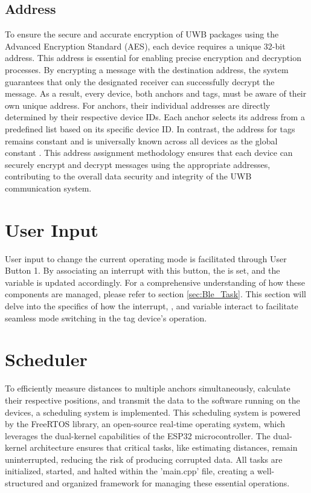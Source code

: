 \subsection{Address}
To ensure the secure and accurate encryption of UWB packages using the Advanced Encryption Standard (AES), each device requires a unique 32-bit address. 
This address is essential for enabling precise encryption and decryption processes. 
By encrypting a message with the destination address, the system guarantees that only the designated receiver can successfully decrypt the message. 
As a result, every device, both anchors and tags, must be aware of their own unique address.
\vspace{4pt}
\newline
For anchors, their individual addresses are directly determined by their respective device IDs. 
Each anchor selects its address from a predefined list based on its specific device ID. 
In contrast, the address for tags remains constant and is universally known across all devices as the global constant . 
This address assignment methodology ensures that each device can securely encrypt and decrypt messages using the appropriate addresses, contributing to the overall data security and integrity of the UWB communication system.

\section{User Input}
User input to change the current operating mode is facilitated through User Button 1. 
By associating an interrupt with this button, the  is set, and the  variable is updated accordingly. 
For a comprehensive understanding of how these components are managed, please refer to section \ref{sec:Ble_Task}. 
This section will delve into the specifics of how the interrupt, , and  variable interact to facilitate seamless mode switching in the tag device's operation. 


\section{Scheduler}
To efficiently measure distances to multiple anchors simultaneously, calculate their respective positions, and transmit the data to the software running on the devices, a scheduling system is implemented. 
This scheduling system is powered by the FreeRTOS library, an open-source real-time operating system, which leverages the dual-kernel capabilities of the ESP32 microcontroller.
\vspace{4pt}
\newline
The dual-kernel architecture ensures that critical tasks, like estimating distances, remain uninterrupted, reducing the risk of producing corrupted data. 
All tasks are initialized, started, and halted within the 'main.cpp' file, creating a well-structured and organized framework for managing these essential operations.

